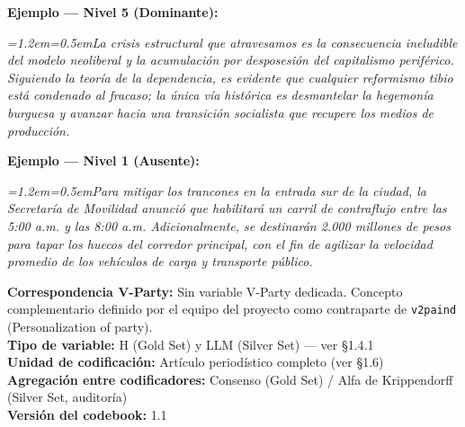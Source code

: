\documentclass[11pt,letterpaper]{article}
\newcommand{\metaficha}[1]{%
  \par\smallskip\noindent\footnotesize\color{gris}%
  \textbf{Correspondencia V-Party:} #1\\
  \textbf{Tipo de variable:} H (Gold Set) y LLM (Silver Set) — ver §1.4.1\\
  \textbf{Unidad de codificación:} Artículo periodístico completo (ver §1.6)\\
  \textbf{Agregación entre codificadores:} Consenso (Gold Set) / Alfa de Krippendorff (Silver Set, auditoría)\\
  \textbf{Versión del codebook:} 1.1\par\normalsize\color{black}\medskip}
\newcommand{\ejemplo}[2]{%
  \par\smallskip\noindent\textbf{Ejemplo — #1:}\par\nopagebreak
  \begingroup\itshape\small\leftskip=1.2em\rightskip=0.5em\noindent #2\par\endgroup\smallskip}
\begin{document}
\ejemplo{Nivel 5 (Dominante)}{La crisis estructural que atravesamos es la consecuencia ineludible del
modelo neoliberal y la acumulación por desposesión del capitalismo periférico. Siguiendo la teoría de la
dependencia, es evidente que cualquier reformismo tibio está condenado al fracaso; la única vía histórica es
desmantelar la hegemonía burguesa y avanzar hacia una transición socialista que recupere los medios de
producción.}

\ejemplo{Nivel 1 (Ausente)}{Para mitigar los trancones en la entrada sur de la ciudad, la Secretaría de
Movilidad anunció que habilitará un carril de contraflujo entre las 5:00 a.m. y las 8:00 a.m. Adicionalmente,
se destinarán 2.000 millones de pesos para tapar los huecos del corredor principal, con el fin de agilizar la
velocidad promedio de los vehículos de carga y transporte público.}

\metaficha{Sin variable V-Party dedicada. Concepto complementario definido por el equipo del proyecto como
contraparte de \texttt{v2paind} (Personalization of party).}

\newpage
\appendix
\end{document}
